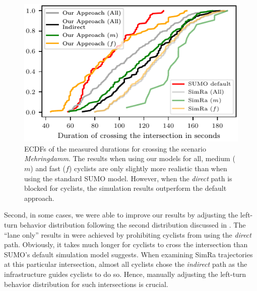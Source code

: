 \begin{figure}
    \centering
    \includegraphics[width=0.7\columnwidth]{fig/im_mehringdamm_ecdf_every.pdf}
    \caption{%
        ECDFs of the measured durations for crossing the scenario \textit{Mehringdamm}.
        The results when using our models for all, medium ($m$) and fast ($f$) cyclists are only slightly more realistic than when using the standard SUMO model.
        However, when the \textit{direct} path is blocked for cyclists, the simulation results outperform the default approach.
    }%
    \label{fig:im_mehringdamm}
\end{figure}

Second, in some cases, we were able to improve our results by adjusting the left-turn behavior distribution following the second distribution discussed in .
The ``lane only'' results in  were achieved by prohibiting cyclists from using the \textit{direct} path.
Obviously, it takes much longer for cyclists to cross the intersection than SUMO's default simulation model suggests.
When examining SimRa trajectories at this particular intersection, almost all cyclists chose the \textit{indirect} path as the infrastructure guides cyclists to do so.
Hence, manually adjusting the left-turn behavior distribution for such intersections is crucial.

